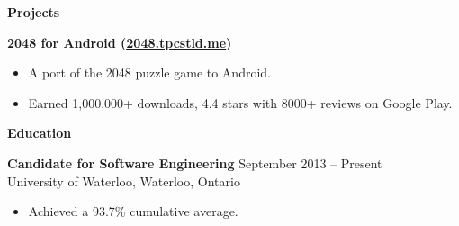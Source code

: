 \documentclass{letter}
\begin{document}
{\bfseries \Large Projects}

\vspace{-1.5mm}
{\bfseries 2048 for Android (\href{http://2048.tpcstld.me}{\uline{2048.tpcstld.me}})}
\vspace{-3mm}
\begin{itemize}
    \item A port of the 2048 puzzle game to Android.
    \item Earned 1,000,000+ downloads, 4.4 stars with 8000+ reviews on Google
      Play.
\end{itemize}

{\bfseries \Large Education}

\vspace{-1.5mm}
{\bfseries Candidate for Software Engineering} \hfill September 2013 -- Present \\
University of Waterloo, Waterloo, Ontario
\vspace{-3mm}
\begin{itemize}
    \item Achieved a 93.7\% cumulative average.
\end{itemize}
\end{document}
